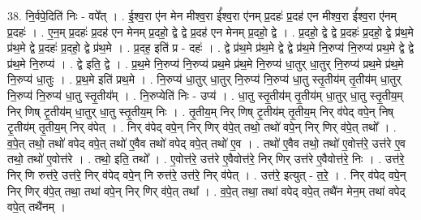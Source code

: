 \documentclass[17pt]{extarticle}
\begin{document}
38. नि॒र्वपे॒दिति॑ निः - वपे᳚त् । . ई॒श्व॒रा ए॑न मेन मीश्व॒रा ई᳚श्व॒रा ए॑नम् प्र॒दहः॑ प्र॒दह॑ एन मीश्व॒रा ई᳚श्व॒रा ए॑नम् प्र॒दहः॑ । . ए॒न॒म् प्र॒दहः॑ प्र॒दह॑ एन मेनम् प्र॒दहो॒ द्वे द्वे प्र॒दह॑ एन मेनम् प्र॒दहो॒ द्वे । . प्र॒दहो॒ द्वे द्वे प्र॒दहः॑ प्र॒दहो॒ द्वे प्र॑थ॒मे प्र॑थ॒मे द्वे प्र॒दहः॑ प्र॒दहो॒ द्वे प्र॑थ॒मे । . प्र॒दह॒ इति॑ प्र - दहः॑ । . द्वे प्र॑थ॒मे प्र॑थ॒मे द्वे द्वे प्र॑थ॒मे नि॒रुप्य॑ नि॒रुप्य॑ प्रथ॒मे द्वे द्वे प्र॑थ॒मे नि॒रुप्य॑ । . द्वे इति॒ द्वे । . प्र॒थ॒मे नि॒रुप्य॑ नि॒रुप्य॑ प्रथ॒मे प्र॑थ॒मे नि॒रुप्य॑ धा॒तुर् धा॒तुर् नि॒रुप्य॑ प्रथ॒मे प्र॑थ॒मे नि॒रुप्य॑ धा॒तुः । . प्र॒थ॒मे इति॑ प्रथ॒मे । . नि॒रुप्य॑ धा॒तुर् धा॒तुर् नि॒रुप्य॑ नि॒रुप्य॑ धा॒तु स्तृ॒तीय॑म् तृ॒तीय॑म् धा॒तुर् नि॒रुप्य॑ नि॒रुप्य॑ धा॒तु स्तृ॒तीय᳚म् । . नि॒रुप्येति॑ निः - उप्य॑ । . धा॒तु स्तृ॒तीय॑म् तृ॒तीय॑म् धा॒तुर् धा॒तु स्तृ॒तीय॒म् निर् णिष् टृ॒तीय॑म् धा॒तुर् धा॒तु स्तृ॒तीय॒म् निः । . तृ॒तीय॒म् निर् णिष् टृ॒तीय॑म् तृ॒तीय॒म् निर् व॑पेद् वपे॒न् निष् टृ॒तीय॑म् तृ॒तीय॒म् निर् व॑पेत् । . निर् व॑पेद् वपे॒न् निर् णिर् व॑पे॒त् तथो॒ तथो॑ वपे॒न् निर् णिर् व॑पे॒त् तथो᳚ । . व॒पे॒त् तथो॒ तथो॑ वपेद् वपे॒त् तथो॑ ए॒वैव तथो॑ वपेद् वपे॒त् तथो॑ ए॒व । . तथो॑ ए॒वैव तथो॒ तथो॑ ए॒वोत्त॑रे॒ उत्त॑रे ए॒व तथो॒ तथो॑ ए॒वोत्त॑रे । . तथो॒ इति॒ तथो᳚ । . ए॒वोत्त॑रे॒ उत्त॑रे ए॒वैवोत्त॑रे॒ निर् णिर् उत्त॑रे ए॒वैवोत्त॑रे॒ निः । . उत्त॑रे॒ निर् णि रुत्त॑रे॒ उत्त॑रे॒ निर् व॑पेद् वपे॒न् नि रुत्त॑रे॒ उत्त॑रे॒ निर् व॑पेत् । . उत्त॑रे॒ इत्युत् - त॒रे॒ । . निर् व॑पेद् वपे॒न् निर् णिर् व॑पे॒त् तथा॒ तथा॑ वपे॒न् निर् णिर् व॑पे॒त् तथा᳚ । . व॒पे॒त् तथा॒ तथा॑ वपेद् वपे॒त् तथै॑न मेन॒म् तथा॑ वपेद् वपे॒त् तथै॑नम् । \newline
\end{document}
